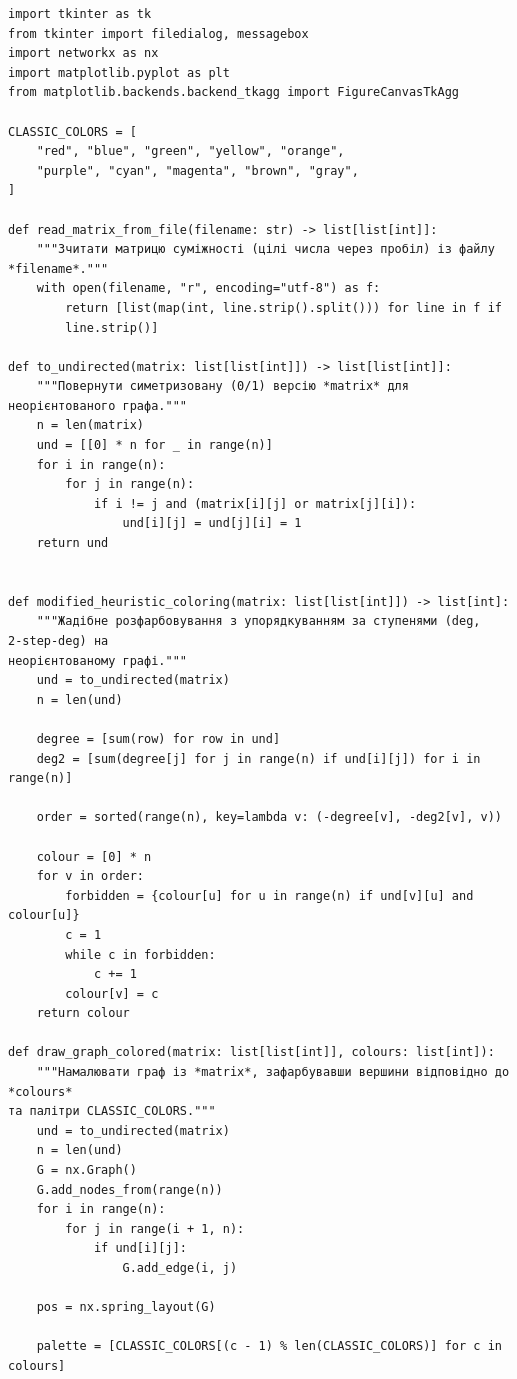 \documentclass[12pt,a4paper]{article}
\begin{document}
    {

    \begin{verbatim}
import tkinter as tk
from tkinter import filedialog, messagebox
import networkx as nx
import matplotlib.pyplot as plt
from matplotlib.backends.backend_tkagg import FigureCanvasTkAgg

CLASSIC_COLORS = [
    "red", "blue", "green", "yellow", "orange",
    "purple", "cyan", "magenta", "brown", "gray",
]

def read_matrix_from_file(filename: str) -> list[list[int]]:
    """Зчитати матрицю суміжності (цілі числа через пробіл) із файлу
*filename*."""
    with open(filename, "r", encoding="utf-8") as f:
        return [list(map(int, line.strip().split())) for line in f if
        line.strip()]

def to_undirected(matrix: list[list[int]]) -> list[list[int]]:
    """Повернути симетризовану (0/1) версію *matrix* для
неорієнтованого графа."""
    n = len(matrix)
    und = [[0] * n for _ in range(n)]
    for i in range(n):
        for j in range(n):
            if i != j and (matrix[i][j] or matrix[j][i]):
                und[i][j] = und[j][i] = 1
    return und


def modified_heuristic_coloring(matrix: list[list[int]]) -> list[int]:
    """Жадібне розфарбовування з упорядкуванням за ступенями (deg, 2‑step‑deg) на
неорієнтованому графі."""
    und = to_undirected(matrix)
    n = len(und)

    degree = [sum(row) for row in und]
    deg2 = [sum(degree[j] for j in range(n) if und[i][j]) for i in range(n)]

    order = sorted(range(n), key=lambda v: (-degree[v], -deg2[v], v))

    colour = [0] * n
    for v in order:
        forbidden = {colour[u] for u in range(n) if und[v][u] and colour[u]}
        c = 1
        while c in forbidden:
            c += 1
        colour[v] = c
    return colour

def draw_graph_colored(matrix: list[list[int]], colours: list[int]):
    """Намалювати граф із *matrix*, зафарбувавши вершини відповідно до *colours*
та палітри CLASSIC_COLORS."""
    und = to_undirected(matrix)
    n = len(und)
    G = nx.Graph()
    G.add_nodes_from(range(n))
    for i in range(n):
        for j in range(i + 1, n):
            if und[i][j]:
                G.add_edge(i, j)

    pos = nx.spring_layout(G)

    palette = [CLASSIC_COLORS[(c - 1) % len(CLASSIC_COLORS)] for c in colours]


\end{verbatim}}
\end{document}
